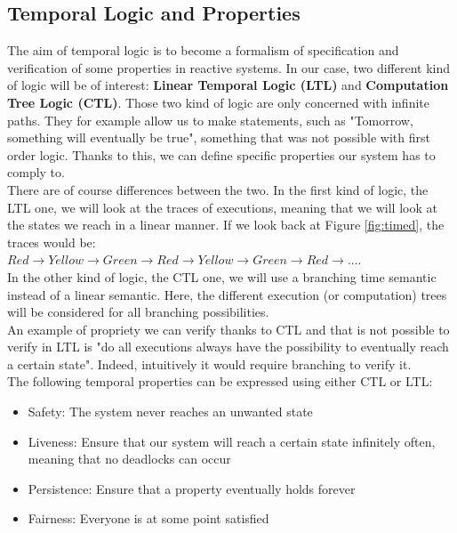 \subsection{Temporal Logic and Properties}
The aim of temporal logic is to become a formalism of specification and verification of some properties in reactive systems. In our case, two different kind of logic will be of interest: \textbf{Linear Temporal Logic (LTL)} and \textbf{Computation Tree Logic (CTL)}. Those two kind of logic are only concerned with infinite paths. They for example allow us to make statements, such as "Tomorrow, something will eventually be true", something that was not possible with first order logic. Thanks to this, we can define specific properties our system has to comply to. \\
There are of course differences between the two. In the first kind of logic, the LTL one, we will look at the traces of executions, meaning that we will look at the states we reach in a linear manner.
If we look back at Figure \ref{fig:timed}, the traces would be:\\ ${Red \rightarrow Yellow \rightarrow Green \rightarrow Red \rightarrow Yellow \rightarrow Green \rightarrow Red \rightarrow ...}$. \\
In the other kind of logic, the CTL one, we will use a branching time semantic instead of a linear semantic. Here, the different execution (or computation) trees will be considered for all branching possibilities. \\
An example of propriety we can verify thanks to CTL and that is not possible to verify in LTL is "do all executions always have the possibility to eventually reach a certain state". Indeed, intuitively it would require branching to verify it. \\
The following temporal properties can be expressed using either CTL or LTL:
\begin{itemize}
    \item Safety: The system never reaches an unwanted state
    \item Liveness: Ensure that our system will reach a certain state infinitely often, meaning that no deadlocks can occur
    \item Persistence: Ensure that a property eventually holds forever
    \item Fairness: Everyone is at some point satisfied
\end{itemize}

